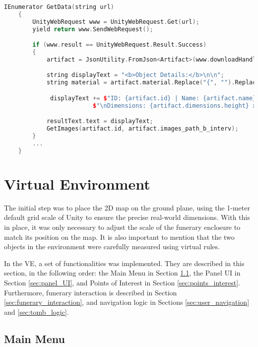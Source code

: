 \begin{lstlisting}[language=C++,label={lst:get_data}, caption={Method used to load object data from the database},float]
      IEnumerator GetData(string url)
    {
        UnityWebRequest www = UnityWebRequest.Get(url);
        yield return www.SendWebRequest();

        if (www.result == UnityWebRequest.Result.Success)
        {
            artifact = JsonUtility.FromJson<Artifact>(www.downloadHandler.text);

            string displayText = "<b>Object Details:</b>\n\n";
            string material = artifact.material.Replace("{", "").Replace("}", "");

             displayText += $"ID: {artifact.id} | Name: {artifact.name} \nMaterial: {material} | Epoch: {artifact.epoch} \nProvenance: {artifact.provenance}" +
                         $"\nDimensions: {artifact.dimensions.height} x {artifact.dimensions.width} cm, Weight: {Mathf.Round(artifact.dimensions.weight * 10.0f) * 0.1f} g";

            resultText.text = displayText;
            GetImages(artifact.id, artifact.images_path_b_interv);
        }
        ...
    }
\end{lstlisting}


\section{Virtual Environment}
\label{sec:implementation}
The initial step was to place the \gls{2D} map on the ground plane, using the 1-meter default grid scale of Unity to ensure the precise real-world dimensions. With this in place, it was only necessary to adjust the scale of the funerary enclosure to match its position on the map. It is also important to mention that the two objects in the environment were carefully measured using virtual rules.

In the \gls{VE}, a set of functionalities was implemented. 
They are described in this section, in the following order: the Main Menu in Section \ref{sec:main_menu}, the Panel \gls{UI} in Section \ref{sec:panel_UI}, and Points of Interest in Section \ref{sec:points_interest}. 
Furthermore, funerary interaction is described in Section \ref{sec:funerary_interaction}, and navigation logic in Sections \ref{sec:user_navigation} and \ref{sec:tomb_logic}.

\subsection{Main Menu}
\label{sec:main_menu}

